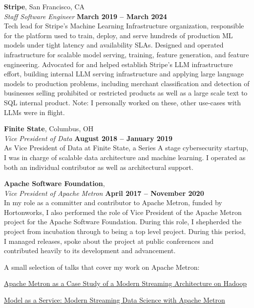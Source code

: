 \documentclass[margin,line,12pt]{resume}
\begin{document}
\begin{resume}
   \textbf{Stripe}, San Francisco, CA\vspace{2mm}\\\vspace{1mm}%
   \textsl{Staff Software Engineer} \hfill \textbf{March 2019 -- March 2024}\\
   Tech lead for Stripe's Machine Learning Infrastructure organization, responsible for
   the platform used to train, deploy, and serve hundreds of production ML models under
   tight latency and availability SLAs. Designed and operated infrastructure for scalable
   model serving, training, feature generation, and feature engineering. Advocated for
   and helped establish Stripe's LLM infrastructure effort, building internal LLM serving
   infrastructure and applying large language models to production problems, including
   merchant classification and detection of businesses selling prohibited or restricted
   products as well as a large scale text to SQL internal product.
   Note: I personally worked on these, other use-cases with LLMs were in flight.

    \textbf{Finite State}, Columbus, OH\vspace{2mm}\\\vspace{1mm}%
    \textsl{Vice President of Data} \hfill \textbf{August 2018 -- January 2019}\\
    As Vice President of Data at Finite State, a Series A stage cybersecurity startup, I
    was in charge of scalable data architecture and machine learning.  I operated as both
    an individual contributor as well as architectural support.

    \textbf{Apache Software Foundation}, \vspace{2mm}\\\vspace{1mm}%
    \textsl{Vice President of Apache Metron} \hfill \textbf{April 2017 -- November 2020}\\
    In my role as a committer and contributor to Apache Metron, funded by Hortonworks, I also
    performed the role of Vice President of the Apache Metron project for the Apache Software
    Foundation.  During this role, I shepherded the project from incubation through to being
    a top level project.  During this period, I managed releases, spoke about the project at
    public conferences and contributed heavily to its development and advancement.

    A small selection of talks that cover my work on Apache Metron:
    \begin{list2}
    \item \href{https://www.slideshare.net/Hadoop_Summit/bringing-it-all-together-apache-metron-incubating-as-a-case-study-of-a-modern-streaming-architecture-on-hadoop}{Apache Metron as a Case Study of a Modern Streaming Architecture on Hadoop}
    \item \href{https://www.slideshare.net/Hadoop_Summit/maas-model-as-a-service-modern-streaming-data-science-with-apache-metron-incubating}{Model as a Service: Modern Streaming Data Science with Apache Metron}
    \end{list2}


\end{resume}
\end{document}
